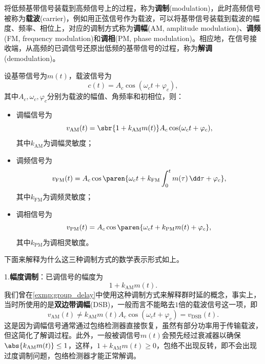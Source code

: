 将低频基带信号装载到高频信号上的过程，称为\textbf{调制}(modulation)，此时高频信号被称为\textbf{载波}(carrier)，例如用正弦信号作为载波，可以将基带信号装载到载波的幅度、频率、相位上，对应的调制方式称为\textbf{调幅}(AM, amplitude modulation)、\textbf{调频}(FM, frequency modulation)和\textbf{调相}(PM, phase modulation)。相应地，在信号接收端，从高频的已调信号还原出低频的基带信号的过程，称为\textbf{解调}(demodulation)。
\begin{definition}[调频、调幅、调相]
    设基带信号为$m(t)$，载波信号为
    \begin{equation}
        c(t)=A_c \cos(\omega_c t+\varphi_c),
    \end{equation}
    其中$A_c,\omega_c,\varphi_c$分别为载波的幅值、角频率和初相位，则：
    \begin{itemize}
        \item 调幅信号为
        \begin{equation}
            v_{\text{AM}}(t)=\sbr{1+k_{\text{AM}} m(t)}A_c \cos(\omega_c t+\varphi_c),
        \end{equation}
        其中$k_{\text{AM}}$为调幅灵敏度；
        \item 调频信号为
        \begin{equation}
            v_{\text{FM}}(t)=A_c \cos\paren{\omega_c t+k_{\text{FM}}\int_{0}^{t}m(\tau)\,\dd\tau+\varphi_c},
        \end{equation}
        其中$k_{\text{FM}}$为调频灵敏度；
        \item 调相信号为
        \begin{equation}
            v_{\text{PM}}(t)=A_c \cos\paren{\omega_c t+k_{\text{PM}} m(t)+\varphi_c},
        \end{equation}
        其中$k_{\text{PM}}$为调相灵敏度。
    \end{itemize}
\end{definition}

下面来解释为什么这三种调制方式的数学表示形式如上。

1.\textbf{幅度调制}：已调信号的幅度为
\begin{equation}
    1+k_{\text{AM}}m(t).
\end{equation}
我们曾在\cref{exmp:group_delay}中使用这种调制方式来解释群时延的概念，事实上，当时所使用的是\textbf{双边带调幅}(DSB)，一般而言不能略去$1$倍的载波信号这一项，即
\begin{equation}
    v_{\text{AM}}(t)\neq k_{\text{AM}} m(t)A_c \cos(\omega_c t+\varphi_c)=v_{\text{DSB}}(t).
\end{equation}
这是因为调幅信号通常通过包络检测器直接恢复，虽然有部分功率用于传输载波，但这简化了解调过程。此外，一般被调信号$m(t)$会预先经过衰减器以确保$\abs{k_{\text{AM}}m(t)}\leq 1$，这样，$1+k_{\text{AM}}m(t)\geq 0$，包络不出现反转，即不会出现过度调制问题，包络检测器才能正常解调。

